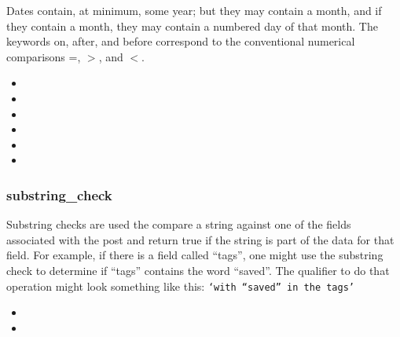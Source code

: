 Dates contain, at minimum, some year; but they may contain a month, and if they contain a month, they may contain a numbered day of
that month. The keywords on, after, and before correspond to the conventional numerical comparisons =, $>$, and $<$.
\begin{itemize}[leftmargin=2in]
    \item[\nonterminal{qualifier}] \bnf{:} 
    \item[\nonterminal{date\_check}] \bnf{:}  \bnf{(} \bnf{|}  \bnf{|} \bnf{)}
    \item[\nonterminal{date}] \bnf{:} \bnf{(}     
    \item[\nonterminal{year}] \bnf{:} 
    \item[\nonterminal{month}] \bnf{:}  \bnf{|}  \bnf{|}  \bnf{|}  \bnf{|}  \bnf{|}  \bnf{|}  \bnf{|}  \bnf{|}  \bnf{|}  \bnf{|}  \bnf{|} 
    \item[\nonterminal{day}] \bnf{:} \bnf{[0-3]}  
\end{itemize}

\subsubsection{substring\_check}
Substring checks are used the compare a string against one of the fields associated with the post and return true if the string is part
of the data for that field. For example, if there is a field called “tags”, one might use the substring check to determine if “tags”
contains the word “saved”. The qualifier to do that operation might look something like this: \texttt{‘with “saved” in the tags’}
\begin{itemize}[leftmargin=2in]
    \item[\nonterminal{qualifier}] \bnf{:} 
    \item[\nonterminal{substring\_check}] \bnf{:}  
\end{itemize}

